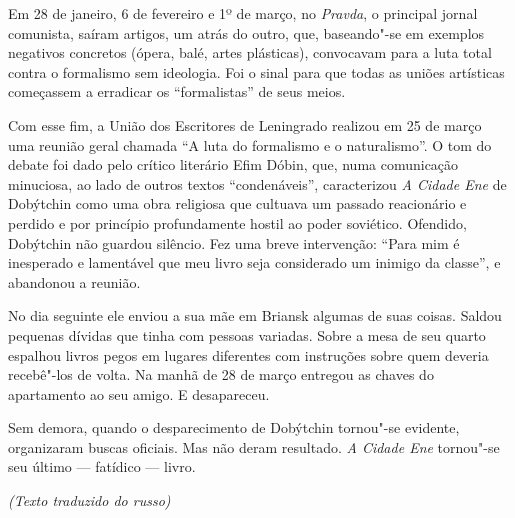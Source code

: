 Em 28 de janeiro, 6 de fevereiro e 1º de março, no \emph{Pravda}, o
principal jornal comunista, saíram artigos, um atrás do outro, que,
baseando"-se em exemplos negativos concretos (ópera, balé, artes
plásticas), convocavam para a luta total contra o formalismo sem
ideologia. Foi o sinal para que todas as uniões artísticas começassem a
erradicar os ``formalistas'' de seus meios.

Com esse fim, a União dos Escritores de Leningrado realizou em 25 de
março uma reunião geral chamada ``A luta do formalismo e o
naturalismo''. O tom do debate foi dado pelo crítico literário Efim
Dóbin, que, numa comunicação minuciosa, ao lado de outros textos
``condenáveis'', caracterizou \emph{A Cidade Ene} de Dobýtchin como uma
obra religiosa que cultuava um passado reacionário e perdido e por
princípio profundamente hostil ao poder soviético. Ofendido, Dobýtchin
não guardou silêncio. Fez uma breve intervenção: ``Para mim é inesperado
e lamentável que meu livro seja considerado um inimigo da classe'', e
abandonou a reunião.

No dia seguinte ele enviou a sua mãe em Briansk algumas de suas coisas.
Saldou pequenas dívidas que tinha com pessoas variadas. Sobre a mesa de
seu quarto espalhou livros pegos em lugares diferentes com instruções
sobre quem deveria recebê"-los de volta. Na manhã de 28 de março entregou
as chaves do apartamento ao seu amigo. E desapareceu.

Sem demora, quando o desparecimento de Dobýtchin tornou"-se evidente,
organizaram buscas oficiais. Mas não deram resultado. \emph{A Cidade
Ene} tornou"-se seu último --- fatídico --- livro.


\begin{flushright}
\emph{(Texto traduzido do russo)}
\end{flushright}
\pagebreak
